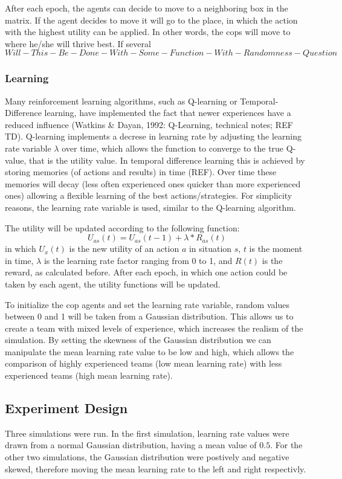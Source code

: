 After each epoch, the agents can decide to move to a neighboring box in the matrix. If the agent decides to move it will go to the place, in which the action with the highest utility can be applied. In other words, the cops will move to where he/she will thrive best. If several 
$$ Will-This-Be-Done-With-Some-Function-With-Randomness-Question$$

\subsubsection{Learning}
Many reinforcement learning algorithms, such as Q-learning or Temporal-Difference learning, have implemented the fact that newer experiences have a reduced influence  (Watkins \& Dayan, 1992: Q-Learning, technical notes; REF TD). Q-learning implements a decrese in learning rate by adjusting the learning rate variable $\lambda$ over time, which allows the function to converge to the true Q-value, that is the utility value. In temporal difference learning this is achieved by storing memories (of actions and results) in time (REF). Over time these memories will decay (less often experienced ones quicker than more experienced ones) allowing a flexible learning of the best actions/strategies. For simplicity reasons, the learning rate variable is used, similar to the Q-learning algorithm. 

The utility will be updated according to the following function:
$$ U_{as}(t) = U_{as}(t-1) + \lambda * R_{as}(t) $$
in which $U_x(t)$ is the new utility of an action $a$ in situation $s$, $t$ is the moment in time, $\lambda$ is the learning rate factor ranging from 0 to 1, and $R(t)$ is the reward, as calculated before. After each epoch, in which one action could be taken by each agent, the utility functions will be updated.

To initialize the cop agents and set the learning rate variable, random values between 0 and 1 will be taken from a Gaussian distribution. This allows us to create a team with mixed levels of experience, which increases the realism of the simulation. By setting the skewness of the Gaussian distribution we can manipulate the mean learning rate value to be low and high, which allows the comparison of highly experienced teams (low mean learning rate) with less experienced teams (high mean learning rate). 

\subsection{Experiment Design}
Three simulations were run. In the first simulation, learning rate values were drawn from a normal Gaussian distribution, having a mean value of $0.5$. For the other two simulations, the Gaussian distribution were postively and negative skewed, therefore moving the mean learning rate to the left and right respectivly. 

